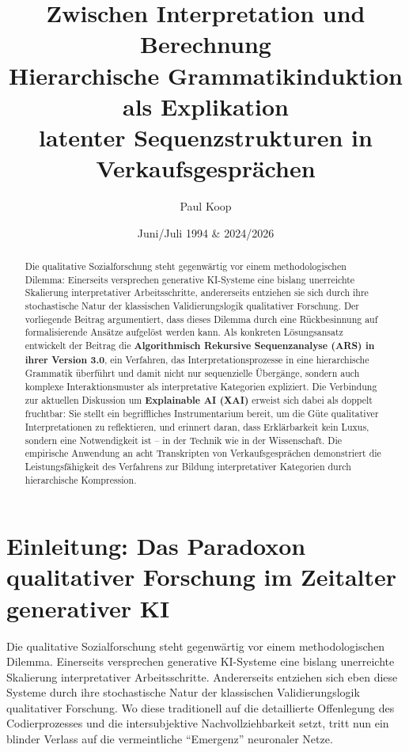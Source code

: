 \documentclass[
  12pt,
  a4paper,
  oneside,
  titlepage
]{article}
\title{\Huge\textbf{Zwischen Interpretation und Berechnung} \\
       \LARGE Hierarchische Grammatikinduktion als Explikation \\
       \LARGE latenter Sequenzstrukturen in Verkaufsgesprächen}
\author{
  \large
  \begin{tabular}{c}
    Paul Koop
  \end{tabular}
}
\date{\large Juni/Juli 1994 \& 2024/2026}
\begin{document}
\maketitle

\begin{abstract}
Die qualitative Sozialforschung steht gegenwärtig vor einem methodologischen Dilemma: 
Einerseits versprechen generative KI-Systeme eine bislang unerreichte Skalierung 
interpretativer Arbeitsschritte, andererseits entziehen sie sich durch ihre stochastische 
Natur der klassischen Validierungslogik qualitativer Forschung. Der vorliegende Beitrag 
argumentiert, dass dieses Dilemma durch eine Rückbesinnung auf formalisierende Ansätze 
aufgelöst werden kann. Als konkreten Lösungsansatz entwickelt der Beitrag die 
\textbf{Algorithmisch Rekursive Sequenzanalyse (ARS) in ihrer Version 3.0}, ein Verfahren, 
das Interpretationsprozesse in eine hierarchische Grammatik überführt und damit nicht nur 
sequenzielle Übergänge, sondern auch komplexe Interaktionsmuster als interpretative 
Kategorien expliziert. Die Verbindung zur aktuellen Diskussion um \textbf{Explainable AI (XAI)} 
erweist sich dabei als doppelt fruchtbar: Sie stellt ein begriffliches Instrumentarium 
bereit, um die Güte qualitativer Interpretationen zu reflektieren, und erinnert daran, 
dass Erklärbarkeit kein Luxus, sondern eine Notwendigkeit ist – in der Technik wie in 
der Wissenschaft. Die empirische Anwendung an acht Transkripten von Verkaufsgesprächen 
demonstriert die Leistungsfähigkeit des Verfahrens zur Bildung interpretativer 
Kategorien durch hierarchische Kompression.
\end{abstract}

\newpage
\tableofcontents
\newpage

\section{Einleitung: Das Paradoxon qualitativer Forschung im Zeitalter generativer KI}

Die qualitative Sozialforschung steht gegenwärtig vor einem methodologischen Dilemma. 
Einerseits versprechen generative KI-Systeme eine bislang unerreichte Skalierung 
interpretativer Arbeitsschritte. Andererseits entziehen sich eben diese Systeme durch 
ihre stochastische Natur der klassischen Validierungslogik qualitativer Forschung. 
Wo diese traditionell auf die detaillierte Offenlegung des Codierprozesses und die 
intersubjektive Nachvollziehbarkeit setzt, tritt nun ein blinder Verlass auf die 
vermeintliche \enquote{Emergenz} neuronaler Netze.
\end{document}

